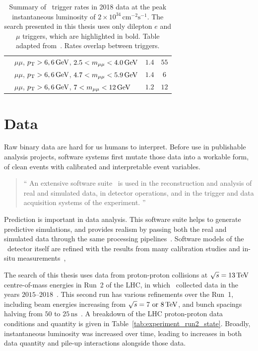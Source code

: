 \begin{table}[tp]
\begin{adjustbox}{width=\textwidth}
\begin{tabular}{llcc}
                               & $\mu\mu$, $\pt > 6, 6\,\eV[G]$, $2.5 < m_{\mu\mu} < 4.0\,\eV[G]$ & $1.4$                         & $55$                          \\
                               & $\mu\mu$, $\pt > 6, 6\,\eV[G]$, $4.7 < m_{\mu\mu} < 5.9\,\eV[G]$ & $1.4$                         & $6$                           \\
                               & $\mu\mu$, $\pt > 6, 6\,\eV[G]$, $7 < m_{\mu\mu} < 12\,\eV[G]$    & $1.2$                         & $12$
\end{tabular}
\end{adjustbox}
\caption[
Summary of \atlas\ trigger rates in 2018 data
]{%
Summary of \atlas\ trigger rates in 2018 data at the peak instantaneous
luminosity of $2\times10^{34}\,\mathrm{cm}^{-2}\mathrm{s}^{-1}$.
The search presented in this thesis uses only dilepton $e$ and $\mu$ triggers,
which are highlighted in bold.
Table adapted from~\cite{ATL-DAQ-PUB-2019-001}.
Rates overlap between triggers.
}
\label{tab:experiment_trigger_breakdown}
\end{table}

\section{Data}
\label{sec:atlas_data}
Raw binary data are hard for us humans to interpret.
Before use in publishable analysis projects, software systems first mutate
those data into a workable form, of clean events with calibrated and
interpretable event variables.
\begin{quote}
``%
An extensive software suite~\cite{ATL-SOFT-PUB-2021-001} is used in the
reconstruction and analysis of real and simulated data, in detector operations,
and in the trigger and data acquisition systems of the experiment.%
''~\cite{atlas2022searches}
\end{quote}
Prediction is important in data analysis.
This software suite helps to generate predictive simulations, and provides
realism by passing both the real and simulated data through the same processing
pipelines~\cite{SOFT-2010-01, geant2003}.
Software models of the \atlas\ detector itself are refined with the results from
many calibration studies and in-situ measurements~\cite{atlas2008experiment},

The search of this thesis uses data from proton-proton collisions at
$\sqrt{s} = 13\,\eV[T]$ centre-of-mass energies in Run~2 of the
LHC, in which \atlas\ collected data in the years
$2015\textrm{--}2018$~\cite{atlas2022searches}.
This second run has various refinements over the Run~1, including beam energies
increasing from $\sqrt{s} = 7\textrm{ or }8\,\eV[T]$, and bunch spacings
halving from $50$ to $25\,\textrm{ns}$~\cite{lhc2006run2}.
A breakdown of the LHC proton-proton data conditions and quantity is given
in Table~\ref{tab:experiment_run2_state}.
Broadly, instantaneous luminosity was increased over time, leading to increases
in both data quantity and pile-up interactions alongside those data.

